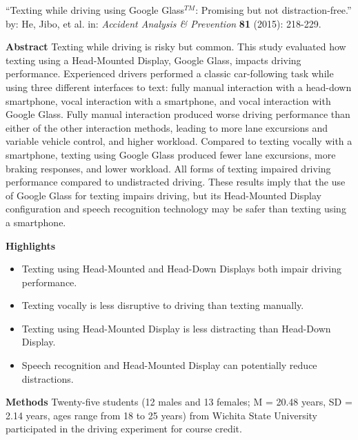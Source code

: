 \begin{list}{}{}
\item [ ``Texting while driving using Google Glass$^{TM}$: Promising but not
  distraction-free.''] by: He, Jibo, et al. in: {\it Accident Analysis
    \& Prevention} {\bf 81} (2015): 218-229.\\
  \begin{list}{}{}
  \item [\bf Abstract] Texting while driving is risky but common. This
    study evaluated how texting using a Head-Mounted Display, Google
    Glass, impacts driving performance. Experienced drivers performed
    a classic car-following task while using three different
    interfaces to text: fully manual interaction with a head-down
    smartphone, vocal interaction with a smartphone, and vocal
    interaction with Google Glass. Fully manual interaction produced
    worse driving performance than either of the other interaction
    methods, leading to more lane excursions and variable vehicle
    control, and higher workload. Compared to texting vocally with a
    smartphone, texting using Google Glass produced fewer lane
    excursions, more braking responses, and lower workload. All forms
    of texting impaired driving performance compared to undistracted
    driving. These results imply that the use of Google Glass for
    texting impairs driving, but its Head-Mounted Display
    configuration and speech recognition technology may be safer than
    texting using a smartphone.
  \item [\bf Highlights]
    \begin{itemize}
    \item Texting using Head-Mounted and Head-Down Displays both
      impair driving performance.
    \item Texting vocally is less disruptive to driving than texting manually.
    \item Texting using Head-Mounted Display is less distracting than Head-Down Display.
    \item Speech recognition and Head-Mounted Display can potentially reduce distractions.
    \end{itemize}
  \item [\bf Methods] Twenty-five students (12 males and 13 females; M
    = 20.48 years, SD = 2.14 years, ages range from 18 to 25 years)
    from Wichita State University participated in the driving
    experiment for course credit.
  

\end{list}
\end{list}
